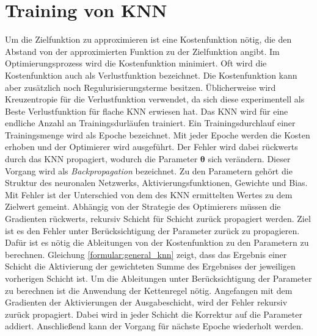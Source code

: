 \section{Training von KNN}
Um die Zielfunktion zu approximieren ist eine Kostenfunktion nötig, die den Abstand von der approximierten Funktion zu der Zielfunktion angibt.
Im Optimierungsprozess wird die Kostenfunktion minimiert. Oft wird die Kostenfunktion auch als Verlustfunktion bezeichnet.
Die Kostenfunktion kann aber zusätzlich noch Regulurisierungsterme besitzen.
Üblicherweise wird Kreuzentropie für die Verlustfunktion verwendet, da sich diese experimentell als Beste Verlustfunktion für flache KNN erwiesen hat.
\newline
\newline
Das KNN wird für eine endliche Anzahl an Trainingsdurläufen trainiert.
Ein Trainingsdurchlauf einer Trainingsmenge wird als Epoche bezeichnet.
Mit jeder Epoche werden die Kosten erhoben und der Optimierer wird ausgeführt.
Der Fehler wird dabei rückwerts durch das KNN propagiert, wodurch die Parameter $\boldsymbol\theta$ sich verändern.
Dieser Vorgang wird als \textit{Backpropagation} bezeichnet.
Zu den Parametern gehört die Struktur des neuronalen Netzwerks, Aktivierungsfunktionen, Gewichte und Bias.
Mit Fehler ist der Unterschied von dem des KNN ermittelten Wertes zu dem Zielwert gemeint.
\newline
\newline
Abhängig von der Strategie des Optimierers müssen die Gradienten rückwerts, rekursiv Schicht für Schicht zurück propagiert werden.
Ziel ist es den Fehler unter Berücksichtigung der Parameter zurück zu propagieren.
Dafür ist es nötig die Ableitungen von der Kostenfunktion zu den Parametern zu berechnen.
Gleichung \ref{formular:general_knn} zeigt, dass das Ergebnis einer Schicht die Aktivierung der gewichteten Summe des
Ergebnises der jeweiligen vorherigen Schicht ist.
Um die Ableitungen unter Berücksichtigung der Parameter zu berechnen ist die Anwendung der Kettenregel nötig.
\newline
\newline
Angefangen mit dem Gradienten der Aktivierungen der Ausgabeschicht, wird der Fehler rekursiv zurück propagiert.
Dabei wird in jeder Schicht die Korrektur auf die Parameter addiert.
Anschließend kann der Vorgang für nächste Epoche wiederholt werden.

